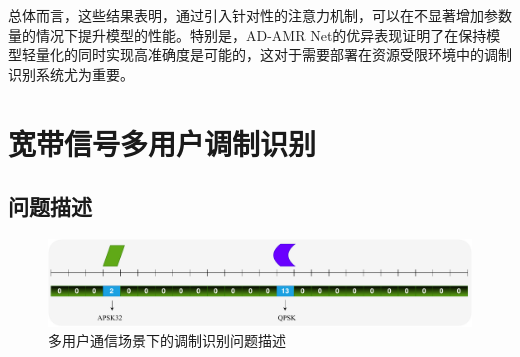 总体而言，这些结果表明，通过引入针对性的注意力机制，可以在不显著增加参数量的情况下提升模型的性能。特别是，AD-AMR Net的优异表现证明了在保持模型轻量化的同时实现高准确度是可能的，这对于需要部署在资源受限环境中的调制识别系统尤为重要。
\section{宽带信号多用户调制识别}\label{sec:background}








\subsection{问题描述}\label{sec:background}

\begin{figure}
    \centering
    \includegraphics[width=\textwidth]{Image/mods.pdf}
    \caption{多用户通信场景下的调制识别问题描述}
    \label{fig:problem_description}

\end{figure}

